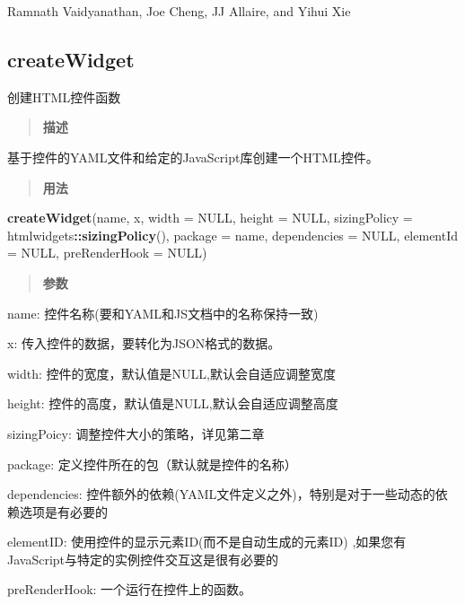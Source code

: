 \documentclass[]{book}
\newenvironment{Shaded}{\begin{snugshade}}{\end{snugshade}}
\newcommand{\KeywordTok}[1]{\textcolor[rgb]{0.13,0.29,0.53}{\textbf{#1}}}
\newcommand{\DataTypeTok}[1]{\textcolor[rgb]{0.13,0.29,0.53}{#1}}
\newcommand{\OtherTok}[1]{\textcolor[rgb]{0.56,0.35,0.01}{#1}}
\newcommand{\OperatorTok}[1]{\textcolor[rgb]{0.81,0.36,0.00}{\textbf{#1}}}
\newcommand{\NormalTok}[1]{#1}
\theoremstyle{definition}
\theoremstyle{definition}
\theoremstyle{definition}
\theoremstyle{remark}
\begin{document}
Ramnath Vaidyanathan, Joe Cheng, JJ Allaire, and Yihui Xie

\subsection{createWidget}\label{createwidget}

创建HTML控件函数

\begin{quote}
\textbf{描述}
\end{quote}

基于控件的YAML文件和给定的JavaScript库创建一个HTML控件。

\begin{quote}
\textbf{用法}
\end{quote}

\begin{Shaded}
\begin{Highlighting}[]
\KeywordTok{createWidget}\NormalTok{(name, x, }\DataTypeTok{width =} \OtherTok{NULL}\NormalTok{, }\DataTypeTok{height =} \OtherTok{NULL}\NormalTok{,}
  \DataTypeTok{sizingPolicy =}\NormalTok{ htmlwidgets}\OperatorTok{::}\KeywordTok{sizingPolicy}\NormalTok{(), }\DataTypeTok{package =}\NormalTok{ name,}
  \DataTypeTok{dependencies =} \OtherTok{NULL}\NormalTok{, }\DataTypeTok{elementId =} \OtherTok{NULL}\NormalTok{, }\DataTypeTok{preRenderHook =} \OtherTok{NULL}\NormalTok{)}
\end{Highlighting}
\end{Shaded}

\begin{quote}
\textbf{参数}
\end{quote}

name: 控件名称(要和YAML和JS文档中的名称保持一致)

x: 传入控件的数据，要转化为JSON格式的数据。

width: 控件的宽度，默认值是NULL,默认会自适应调整宽度

height: 控件的高度，默认值是NULL,默认会自适应调整高度

sizingPoicy: 调整控件大小的策略，详见第二章

package: 定义控件所在的包（默认就是控件的名称）

dependencies:
控件额外的依赖(YAML文件定义之外)，特别是对于一些动态的依赖选项是有必要的

elementID: 使用控件的显示元素ID(而不是自动生成的元素ID)
,如果您有JavaScript与特定的实例控件交互这是很有必要的

preRenderHook: 一个运行在控件上的函数。
\end{document}
